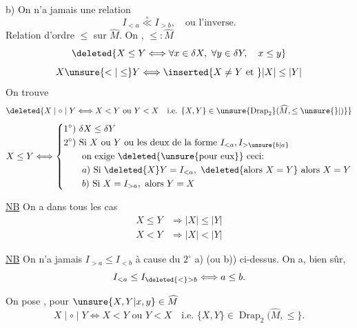 b) On n'a jamais une relation
\[
I_{<a}\overset{\circ}{\ll}I_{>b},\quad\text{ou l'inverse.}
\]
Relation d'ordre $\leq$ sur $\widehat M$. On ,    $\leq:\widehat M$ 
\[
\deleted{X\leq Y\Longleftrightarrow\forall x\in\delta X,\ \forall y\in\delta Y,\quad x\leq y}
\]
\[
X\unsure{<|\leq}Y\Longleftrightarrow\inserted{X\ne Y\text{ et }}|X|\leq|Y|
\]
On trouve
\[
\deleted{X\mid\circ\mid Y\Longleftrightarrow X<Y\text{ ou }Y<X\quad\text{i.e. }\{X,Y\}\in\unsure{\operatorname{Drap}_2}(\widehat M,\leq\unsure{\}|)}}
\]
\[
X\leq Y\Longleftrightarrow
\left\{\begin{aligned}
&1^\circ)\ \delta X\leq\delta Y\\
&2^\circ)\ \text{Si }X\text{ ou }Y\text{ ou les deux de la forme }I_{<a},I_{>\unsure{b|a}}\\
&\qquad\text{on exige }\deleted{\text{\unsure{pour eux}}}\text{ ceci:}\\
&\qquad a)\ \text{Si }\deleted{X}Y=I_{<a},\ \deleted{\text{alors }X=Y}\text{ alors }X=Y\\
&\qquad b)\ \text{Si }X=I_{>a},\ \text{alors }Y=X
\end{aligned}\right.
\]

\uline{NB} On a dans tous les cas
\[
\begin{aligned}
X\leq Y&\Longrightarrow |X|\leq|Y|\\
X<Y&\Longrightarrow |X|<|Y|
\end{aligned}
\]

\uline{NB} On n'a jamais $I_{>a}\leq I_{<b}$ à cause du $2^\circ$ a) (ou b)) ci-dessus. On a, bien sûr,
\[
I_{<a}\leq I_{\deleted{<}>b}\Longleftrightarrow a\leq b.
\]

On pose \deleted{$\unsure{\varphi|\phi}$}, pour $\unsure{X,Y|x,y}\in\widehat M$
\[
X\mid\circ\mid Y\Longleftrightarrow X<Y\text{ ou }Y<X\quad\text{i.e. }\{X,Y\}\in\operatorname{Drap}_2(\widehat M,\leq\}.
\]

